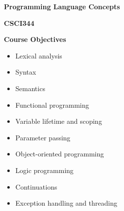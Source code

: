 \begin{minipage}[t]{\sw}
\slidenumber
\LARGE
\centerline{\bf Programming Language Concepts}
\centerline{\bf CSCI344}
{\bf Course Objectives}\\
\begin{itemize}
\item
  Lexical analysis
\item
  Syntax
\item
  Semantics
\item
  Functional programming
\item
  Variable lifetime and scoping
\item
  Parameter passing
\item
  Object-oriented programming
\item
  Logic programming
\item
  Continuations
\item
  Exception handling and threading
\end{itemize}
\end{minipage}
\clearpage
